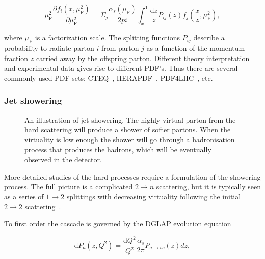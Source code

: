 \begin{equation}
\mu_\mathrm{F}^2 \frac{\partial f_i\left(x,\mu_{\mathrm{F}}^2 \right)}{\partial \mu_{\mathrm{F}}^2} = \Sigma_j \frac{\alpha_s\left(\mu_{\mathrm{F}}\right)}{2{pi}} \int _x^1 \frac{\mathrm{d}z}{z} P_{ij}(z) f_j\left(\frac{x}{z},\mu_{\mathrm{F}}^2\right),
\label{eq:dglap}
\end{equation}



\noindent where $\mu_{\mathrm{F}}$ is a factorization scale. The splitting functions $P_{ij}$ describe a probability to radiate parton $i$ from parton $j$ as a function of the momentum fraction $z$ carried away by the offspring parton. Different theory interpretation and experimental data gives rise to different PDF's. Thus there are several commonly used PDF sets: CTEQ~\cite{cteq}, HERAPDF~\cite{CooperSarkar:2011aa}, PDF4LHC~\cite{Butterworth:2015oua}, etc. %

\subsubsection{Jet showering}
\label{sec:shower}
\begin{figure}
\centering

\caption[Jet showering]{An illustration of jet showering. The highly virtual parton from the hard scattering will produce a shower of softer partons. When the virtuality is low enough the shower will go through a hadronisation process that produces the hadrons, which will be eventually observed in the detector. }
\label{fig:showering}
\end{figure}

More detailed studies of the hard processes require a formulation of the showering process. The full picture is a complicated $2\rightarrow n$ scattering, but it is typically seen as a series of $1\rightarrow2$ splittings with decreasing virtuality following the initial $2\rightarrow 2$ scattering~\cite{newPythiaShower}.

To first order the cascade is governed by the DGLAP evolution equation~\cite{Gribov:1972ri,Altarelli:1977zs,Dokshitzer:1977sg}

\begin{equation}
\mathrm{d} P_a\left(z,Q^2\right) = \frac{\mathrm{d}Q^2}{Q^2}\frac{\alpha_s}{2\pi} P_{a\rightarrow bc}\left(z\right)dz,
\label{eq:dglap}
\end{equation} 

